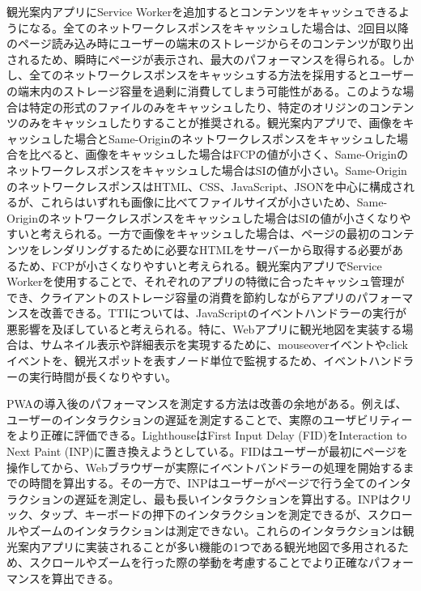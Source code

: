 観光案内アプリにService Workerを追加するとコンテンツをキャッシュできるようになる。全てのネットワークレスポンスをキャッシュした場合は、2回目以降のページ読み込み時にユーザーの端末のストレージからそのコンテンツが取り出されるため、瞬時にページが表示され、最大のパフォーマンスを得られる。しかし、全てのネットワークレスポンスをキャッシュする方法を採用するとユーザーの端末内のストレージ容量を過剰に消費してしまう可能性がある。このような場合は特定の形式のファイルのみをキャッシュしたり、特定のオリジンのコンテンツのみをキャッシュしたりすることが推奨される。観光案内アプリで、画像をキャッシュした場合とSame-Originのネットワークレスポンスをキャッシュした場合を比べると、画像をキャッシュした場合はFCPの値が小さく、Same-Originのネットワークレスポンスをキャッシュした場合はSIの値が小さい。Same-OriginのネットワークレスポンスはHTML、CSS、JavaScript、JSONを中心に構成されるが、これらはいずれも画像に比べてファイルサイズが小さいため、Same-Originのネットワークレスポンスをキャッシュした場合はSIの値が小さくなりやすいと考えられる。一方で画像をキャッシュした場合は、ページの最初のコンテンツをレンダリングするために必要なHTMLをサーバーから取得する必要があるため、FCPが小さくなりやすいと考えられる。観光案内アプリでService Workerを使用することで、それぞれのアプリの特徴に合ったキャッシュ管理ができ、クライアントのストレージ容量の消費を節約しながらアプリのパフォーマンスを改善できる。TTIについては、JavaScriptのイベントハンドラーの実行が悪影響を及ぼしていると考えられる。特に、Webアプリに観光地図を実装する場合は、サムネイル表示や詳細表示を実現するために、mouseoverイベントやclickイベントを、観光スポットを表すノード単位で監視するため、イベントハンドラーの実行時間が長くなりやすい。

PWAの導入後のパフォーマンスを測定する方法は改善の余地がある。例えば、ユーザーのインタラクションの遅延を測定することで、実際のユーザビリティーをより正確に評価できる。LighthouseはFirst Input Delay (FID)をInteraction to Next Paint (INP)に置き換えようとしている。FIDはユーザーが最初にページを操作してから、Webブラウザーが実際にイベントバンドラーの処理を開始するまでの時間を算出する。その一方で、INPはユーザーがページで行う全てのインタラクションの遅延を測定し、最も長いインタラクションを算出する。INPはクリック、タップ、キーボードの押下のインタラクションを測定できるが、スクロールやズームのインタラクションは測定できない。これらのインタラクションは観光案内アプリに実装されることが多い機能の1つである観光地図で多用されるため、スクロールやズームを行った際の挙動を考慮することでより正確なパフォーマンスを算出できる。


